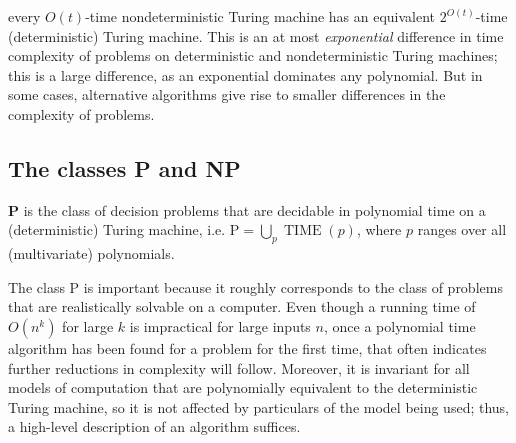  every $O(t)$-time nondeterministic Turing machine has an equivalent $2^{O(t)}$-time (deterministic) Turing machine. This is an at most \textit{exponential} difference in time complexity of problems on deterministic and nondeterministic Turing machines; this is a large difference, as an exponential dominates any polynomial. But in some cases, alternative algorithms give rise to smaller differences in the complexity of problems.

\subsection{The classes P and NP}

\begin{definition}\label{def:class_P}
  \textbf{P} is the class of decision problems that are decidable in polynomial time  on a (deterministic) Turing machine, i.e. $\mathrm{P} = \bigcup_p \operatorname{TIME}(p)$, where $p$ ranges over all (multivariate) polynomials.
\end{definition}

The class P is important because it roughly corresponds to the class of problems that are  realistically solvable on a computer. Even though a running time of $O(n^k)$ for large $k$ is impractical for large inputs $n$, once a polynomial time algorithm has been found for a problem for the first time, that often indicates further reductions in complexity will follow. Moreover, it is invariant for all models of computation that are polynomially equivalent to the deterministic Turing machine, so it is not affected by particulars of the model being used; thus, a high-level description of an algorithm suffices.



